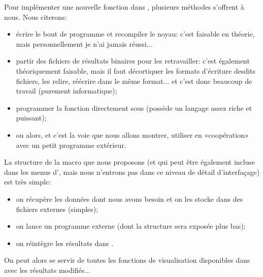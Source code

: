 \medskip
Pour implémenter une nouvelle fonction dans \ansys, plusieurs méthodes s'offrent à nous. Nous citerons:
\begin{itemize}
  \item écrire le bout de programme et recompiler le noyau: c'est faisable en théorie, mais personnellement je n'ai jamais réussi...
  \item partir des fichiers de résultats binaires pour les retravailler: c'est également théoriquement faisable, mais 	il faut décortiquer les formats d'écriture desdits fichiers, les relire, réécrire dans le même format... et c'est donc beaucoup de travail (purement informatique);
  \item programmer la fonction directement sous \ansys (\ansys possède un langage assez riche et puissant);
  \item ou alors, et c'est la voie que nous allons montrer, utiliser \ansys en «coopération» avec un petit programme extérieur.
\end{itemize}

\medskip
La structure de la macro \ansys que nous proposons (et qui peut être également incluse dans les menus d'\ansys, mais nous n'entrons pas dans ce niveau de détail d'interfaçage) est très simple:
\begin{itemize}
  \item on récupère les données dont nous avons besoin et on les stocke dans des fichiers externes (simples);
  \item on lance un programme externe (dont la structure sera exposée plus bas);
  \item on réintègre les résultats dans \ansys.
\end{itemize}
On peut alors se servir de toutes les fonctions de visualisation disponibles dans \ansys avec les résultats modifiés...

